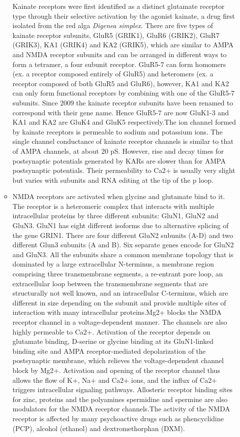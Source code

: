 \begin{itemize}
\begin{itemize}
    Kainate receptors were first identified as a distinct glutamate receptor type through their selective activation by the agonist kainate, a drug first isolated from the red alga \emph{Digenea simplex}. There are five types of kainate receptor subunits, GluR5 (GRIK1), GluR6 (GRIK2), GluR7 (GRIK3), KA1 (GRIK4) and KA2 (GRIK5), which are similar to AMPA and NMDA receptor subunits and can be arranged in different ways to form a tetramer, a four subunit receptor. GluR5-7 can form homomers (ex. a receptor composed entirely of GluR5) and heteromers (ex. a receptor composed of both GluR5 and GluR6), however, KA1 and KA2 can only form functional receptors by combining with one of the GluR5-7 subunits. Since 2009 the kainate receptor subunits have been renamed to correspond with their gene name. Hence GluR5-7 are now GluK1-3 and KA1 and KA2 are GluK4 and GluK5 respectively.The ion channel formed by kainate receptors is permeable to sodium and potassium ions. The single channel conductance of kainate receptor channels is similar to that of AMPA channels, at about 20 pS. However, rise and decay times for postsynaptic potentials generated by KARs are slower than for AMPA postsynaptic potentials. Their permeability to Ca2+ is usually very slight but varies with subunits and RNA editing at the tip of the p loop.
  \item
    NMDA receptors are activated when glycine and glutamate bind to it. The receptor is a heteromeric complex that interacts with multiple intracellular proteins by three different subunits: GluN1, GluN2 and GluN3. GluN1 has eight different isoforms due to alternative splicing of the gene GRIN1. There are four different GluN2 subunits (A-D) and two different Glun3 subunits (A and B). Six separate genes encode for GluN2 and GluN3. All the subunits share a common membrane topology that is dominated by a large extracellular N-terminus, a membrane region comprising three transmembrane segments, a re-entrant pore loop, an extracellular loop between the transmembrane segments that are structurally not well known, and an intracellular C-terminus, which are different in size depending on the subunit and provide multiple sites of interaction with many intracellular proteins.Mg2+ blocks the NMDA receptor channel in a voltage-dependent manner. The channels are also highly permeable to Ca2+. Activation of the receptor depends on glutamate binding, D-serine or glycine binding at its GluN1-linked binding site and AMPA receptor-mediated depolarization of the postsynaptic membrane, which relieves the voltage-dependent channel block by Mg2+. Activation and opening of the receptor channel thus allows the flow of K+, Na+ and Ca2+ ions, and the influx of Ca2+ triggers intracellular signaling pathways. Allosteric receptor binding sites for zinc, proteins and the polyamines spermidine and spermine are also modulators for the NMDA receptor channels.The activity of the NMDA receptor is affected by many psychoactive drugs such as phencyclidine (PCP), alcohol (ethanol) and dextromethorphan (DXM).

\end{itemize}
\end{itemize}
